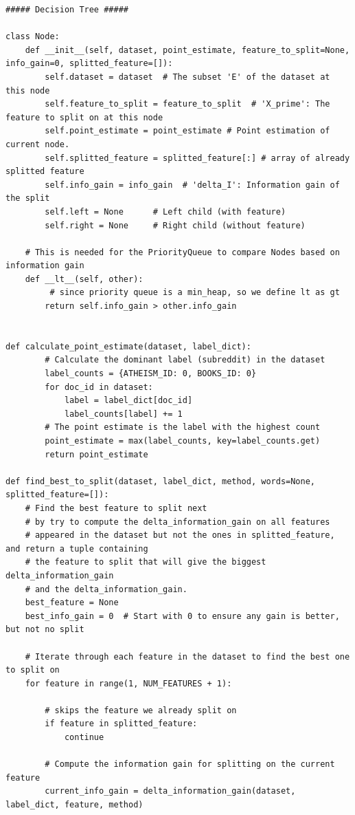 \documentclass[10pt]{article}
\begin{document}
\begin{enumerate}
\begin{lstlisting}
##### Decision Tree #####

class Node:
    def __init__(self, dataset, point_estimate, feature_to_split=None, info_gain=0, splitted_feature=[]):
        self.dataset = dataset  # The subset 'E' of the dataset at this node
        self.feature_to_split = feature_to_split  # 'X_prime': The feature to split on at this node
        self.point_estimate = point_estimate # Point estimation of current node.
        self.splitted_feature = splitted_feature[:] # array of already splitted feature
        self.info_gain = info_gain  # 'delta_I': Information gain of the split
        self.left = None      # Left child (with feature)
        self.right = None     # Right child (without feature)

    # This is needed for the PriorityQueue to compare Nodes based on information gain
    def __lt__(self, other):
         # since priority queue is a min_heap, so we define lt as gt
        return self.info_gain > other.info_gain
    
    
def calculate_point_estimate(dataset, label_dict):
        # Calculate the dominant label (subreddit) in the dataset
        label_counts = {ATHEISM_ID: 0, BOOKS_ID: 0}
        for doc_id in dataset:
            label = label_dict[doc_id]
            label_counts[label] += 1
        # The point estimate is the label with the highest count
        point_estimate = max(label_counts, key=label_counts.get)
        return point_estimate
    
def find_best_to_split(dataset, label_dict, method, words=None, splitted_feature=[]):
    # Find the best feature to split next
    # by try to compute the delta_information_gain on all features 
    # appeared in the dataset but not the ones in splitted_feature, and return a tuple containing
    # the feature to split that will give the biggest delta_information_gain
    # and the delta_information_gain.
    best_feature = None
    best_info_gain = 0  # Start with 0 to ensure any gain is better, but not no split

    # Iterate through each feature in the dataset to find the best one to split on
    for feature in range(1, NUM_FEATURES + 1):
        
        # skips the feature we already split on
        if feature in splitted_feature:
            continue
        
        # Compute the information gain for splitting on the current feature
        current_info_gain = delta_information_gain(dataset, label_dict, feature, method)
        

\end{lstlisting}
\end{enumerate}
\end{document}
